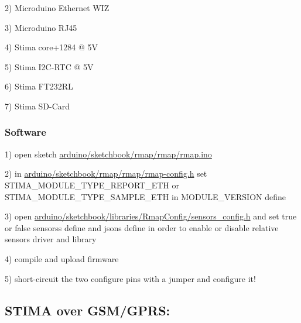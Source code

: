 2) Microduino Ethernet W\+IZ

3) Microduino R\+J45

4) Stima core+1284 @ 5V

5) Stima I2\+C-\/\+R\+TC @ 5V

6) Stima F\+T232\+RL

7) Stima S\+D-\/\+Card\hypertarget{index_stima_ethernet_software}{}\subsubsection{Software}\label{index_stima_ethernet_software}
1) open sketch \hyperlink{rmap_8ino}{arduino/sketchbook/rmap/rmap/rmap.\+ino}

2) in \hyperlink{rmap-config_8h}{arduino/sketchbook/rmap/rmap/rmap-\/config.\+h} set S\+T\+I\+M\+A\+\_\+\+M\+O\+D\+U\+L\+E\+\_\+\+T\+Y\+P\+E\+\_\+\+R\+E\+P\+O\+R\+T\+\_\+\+E\+TH or S\+T\+I\+M\+A\+\_\+\+M\+O\+D\+U\+L\+E\+\_\+\+T\+Y\+P\+E\+\_\+\+S\+A\+M\+P\+L\+E\+\_\+\+E\+TH in M\+O\+D\+U\+L\+E\+\_\+\+V\+E\+R\+S\+I\+ON define

3) open \hyperlink{sensors__config_8h}{arduino/sketchbook/libraries/\+Rmap\+Config/sensors\+\_\+config.\+h} and set true or false sensors\textquotesingle{}s define and json\textquotesingle{}s define in order to enable or disable relative sensor\textquotesingle{}s driver and library

4) compile and upload firmware

5) short-\/circuit the two configure pins with a jumper and configure it!\hypertarget{index_stima_gsm}{}\subsection{S\+T\+I\+M\+A over G\+S\+M/\+G\+P\+R\+S\+:}\label{index_stima_gsm}
 
